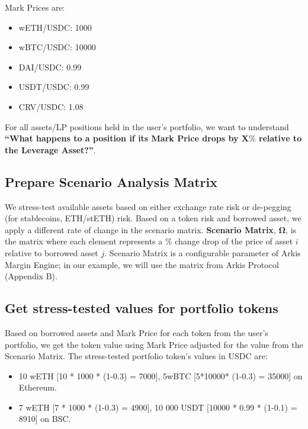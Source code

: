 \documentclass[conference]{IEEEtran}
\begin{document}
Mark Prices are:

\begin{itemize}
	\item wETH/USDC: 1000
	\item wBTC/USDC: 10000
	\item DAI/USDC: 0.99
	\item USDT/USDC: 0.99
	\item CRV/USDC: 1.08
\end{itemize}

For all assets/LP positions held in the user's portfolio, we want to understand \textbf{“What happens to a position if its Mark Price drops by X$\%$ relative to the Leverage Asset?”}. 

\subsection{Prepare Scenario Analysis Matrix}
We stress-test available assets based on either exchange rate risk or de-pegging (for stablecoins, ETH/stETH) risk. Based on a token risk and borrowed asset, we apply a different rate of change in the scenario matrix. \textbf{Scenario Matrix}, $\boldsymbol{\Omega}$, is the matrix where each element represents a $\%$ change drop of the price of asset $i$ relative to borrowed asset $j$. Scenario Matrix is a configurable parameter of Arkis Margin Engine; in our example, we will use the matrix from Arkis Protocol (Appendix B).



\subsection{Get stress-tested values for portfolio tokens}
Based on borrowed assets and Mark Price for each token from the user’s portfolio, we get the token value using Mark Price adjusted for the value from the Scenario Matrix. The stress-tested portfolio token’s values in USDC are:
\begin{itemize}
	\item 10 wETH [10 * 1000 * (1-0.3) = 7000], 5wBTC [5*10000* (1-0.3) = 35000] on Ethereum.
	\item 7 wETH [7 * 1000 * (1-0.3) = 4900], 10 000 USDT [10000 * 0.99 * (1-0.1) = 8910] on BSC.
\end{itemize}
\end{document}
